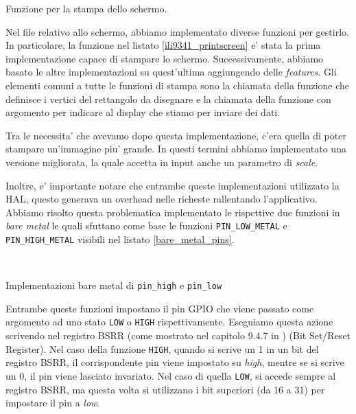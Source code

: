 \documentclass[a4paper]{article}
\begin{document}
\begin{Listing}[h!t] %
    \centering
    \caption{Funzione per la stampa dello schermo.}
    \label{ili9341_printscreen}
\end{Listing}

Nel file relativo allo schermo, abbiamo implementato diverse funzioni per gestirlo. In particolare, la funzione nel listato \ref{ili9341_printscreen} e' stata la prima implementazione capace di stampare lo schermo. Successivamente, abbiamo basato le altre implementazioni su quest'ultima aggiungendo delle \textit{features}.
Gli elementi comuni a tutte le funzioni di stampa sono la chiamata della funzione {} che definisce i vertici del rettangolo da disegnare e la chiamata della funzione  con argomento {} per indicare al display che stiamo per inviare dei dati.

Tra le necessita' che avevamo dopo questa implementazione, c'era quella di poter stampare un'immagine piu' grande. In questi termini abbiamo implementato una versione migliorata, la quale accetta in input anche un parametro di \textit{scale}.

Inoltre, e' importante notare che entrambe queste implementazioni utilizzato la HAL, questo generava un overhead nelle richeste rallentando l'applicativo. Abbiamo risolto questa problematica implementato le rispettive due funzioni in \textit{bare metal} le quali sfuttano come base le funzioni \texttt{PIN\_LOW\_METAL} e \texttt{PIN\_HIGH\_METAL} visibili nel listato \ref{bare_metal_pins}.

\begin{Listing}
    \centering
    \mbox{
        \quad
    }
    \caption{Implementazioni bare metal di \texttt{pin\_high} e \texttt{pin\_low}}
    \label{bare_metal_pins}
\end{Listing}

Entrambe queste funzioni impostano il pin GPIO che viene passato come argomento ad uno stato \texttt{LOW} o \texttt{HIGH} rispettivamente.  Eseguiamo questa azione scrivendo nel registro BSRR (come mostrato nel capitolo 9.4.7 in \cite{STM32F334xx}) (Bit Set/Reset Register). Nel caso della funzione \texttt{HIGH}, quando si scrive un 1 in un bit del registro BSRR, il corrispondente pin viene impostato su \textit{high}, mentre se si scrive un 0, il pin viene lasciato invariato. Nel caso di quella \texttt{LOW}, si accede sempre al registro BSRR, ma questa volta si utilizzano i bit superiori (da 16 a 31) per impostare il pin a \textit{low}.
\end{document}
